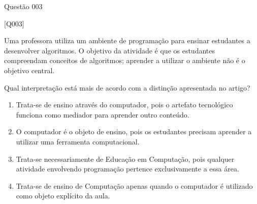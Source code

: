 \documentclass[xcolor=dvipsnames,table]{beamer}
\begin{document}
     \begin{frame}{Questão 003}

		\small

        \begin{block}{[Q003]}

            Uma professora utiliza um ambiente de programação para ensinar estudantes a desenvolver algoritmos. O objetivo da atividade é que os estudantes compreendam conceitos de algoritmos; aprender a utilizar o ambiente não é o objetivo central.

            Qual interpretação está mais de acordo com a distinção apresentada no artigo?

        \end{block}

        \begin{enumerate}[label=(\Alph*)]

            \item Trata-se de ensino através do computador, pois o artefato tecnológico funciona como mediador para aprender outro conteúdo.
            
			\item O computador é o objeto de ensino, pois os estudantes precisam aprender a utilizar uma ferramenta computacional.        

            \item Trata-se necessariamente de Educação em Computação, pois qualquer atividade envolvendo programação pertence exclusivamente a essa área.

            \item Trata-se de ensino de Computação apenas quando o computador é utilizado como objeto explícito da aula.

        \end{enumerate}

    \end{frame}
\end{document}

